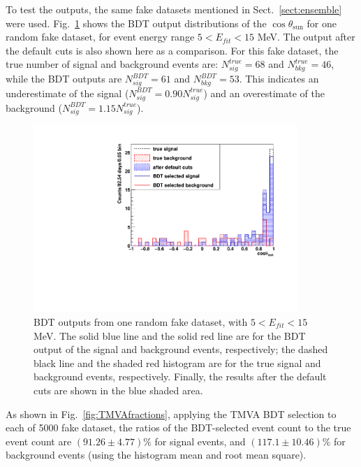 To test the outputs, the same fake datasets mentioned in Sect.~\ref{sect:ensemble} were used. Fig.~\ref{fig:BDToutputs} shows the BDT output distributions of the $\cos\theta_\mathrm{sun}$ for one random fake dataset, for event energy range $5<E_{fit}<15$ MeV. The output after the default cuts is also shown here as a comparison. For this fake dataset, the true number of signal and background events are: $N^{true}_{sig}=68$ and $N^{true}_{bkg}=46$, while the BDT outputs are $N^{BDT}_{sig}=61$ and $N^{BDT}_{bkg}=53$. This indicates an underestimate of the signal ($N^{BDT}_{sig}=0.90 N^{true}_{sig}$) and an overestimate of the background ($N^{BDT}_{sig}=1.15 N^{true}_{sig}$). 

\begin{figure}[!htb]
	\centering
	\includegraphics[width=10cm]{tmvaHalfFakeData_output.pdf}
	\caption[BDT outputs from one random fake dataset, with $5<E_{fit}<15$ MeV.]{BDT outputs from one random fake dataset, with $5<E_{fit}<15$ MeV. The solid blue line and the solid red line are for the BDT output of the signal and background events, respectively; the dashed black line and the shaded red histogram are for the true signal and background events, respectively. Finally, the results after the default cuts are shown in the blue shaded area.\label{fig:BDToutputs}}
\end{figure}

As shown in Fig.~\ref{fig:TMVAfractions}, applying the TMVA BDT selection to each of 5000 fake dataset, the ratios of the BDT-selected event count to the true event count are $(91.26\pm 4.77)\%$ for signal events, and $(117.1\pm 10.46)\%$ for background events (using the histogram mean and root mean square). 

